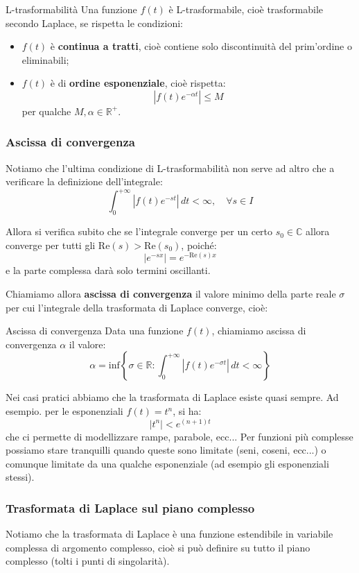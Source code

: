 \documentclass[a4paper,11pt]{article}
\begin{document}
\begin{definition}{L-trasformabilità}
	Una funzione $f(t)$ è L-trasformabile, cioè trasformabile secondo Laplace, se rispetta le condizioni:
	\begin{itemize}
		\item $f(t)$ è \textbf{continua a tratti}, cioè contiene solo discontinuità del prim'ordine o eliminabili;
		\item $f(t)$ è di \textbf{ordine esponenziale}, cioè rispetta:
			$$
			|f(t)e^{-\alpha t}| \leq M
			$$
			per qualche $M, \alpha \in \mathbb{R}^+$.
	\end{itemize}
\end{definition}

\subsubsection{Ascissa di convergenza}
Notiamo che l'ultima condizione di L-trasformabilità non serve ad altro che a verificare la definizione dell'integrale:
$$
\int_{0}^{+\infty} |f(t)e^{-st}| \, dt < \infty, \quad \forall s \in I
$$

Allora si verifica subito che se l'integrale converge per un certo $s_0 \in \mathbb{C}$ allora converge per tutti gli $\mathrm{Re}(s) > \mathrm{Re}(s_0)$, poiché:
$$
|e^{-sx}| = e^{-\mathrm{Re}(s) x}
$$
e la parte complessa darà solo termini oscillanti.

Chiamiamo allora \textbf{ascissa di convergenza} il valore minimo della parte reale $\sigma$ per cui l'integrale della trasformata di Laplace converge, cioè:
\begin{definition}{Ascissa di convergenza}
	Data una funzione $f(t)$, chiamiamo ascissa di convergenza $\alpha$ il valore:
	$$
	\alpha = \mathrm{inf} \left\{ \sigma \in \mathbb{R} : \int_{0}^{+\infty} |f(t)e^{-\sigma t}| \, dt < \infty \right\}
	$$
\end{definition}

\par\smallskip

Nei casi pratici abbiamo che la trasformata di Laplace esiste quasi sempre.
Ad esempio. per le esponenziali $f(t) = t^n$, si ha:
$$
|t^n| < e^{(n + 1)t}
$$
che ci permette di modellizzare rampe, parabole, ecc...
Per funzioni più complesse possiamo stare tranquilli quando queste sono limitate (seni, coseni, ecc...) o comunque limitate da una qualche esponenziale (ad esempio gli esponenziali stessi).

\subsubsection{Trasformata di Laplace sul piano complesso}
Notiamo che la trasformata di Laplace è una funzione estendibile in variabile complessa di argomento complesso, cioè si può definire su tutto il piano complesso (tolti i punti di singolarità).
\end{document}
